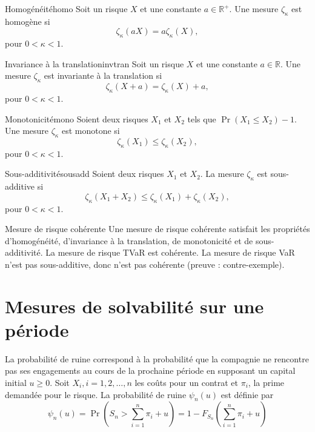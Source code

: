 \begin{propriete}{Homogénéité}{homo}
	Soit un risque $X$ et une constante $a \in \mathbb{R}^+$. Une mesure $\zeta_\kappa$ est homogène si $$\zeta_\kappa(aX) = a\zeta_\kappa(X),$$
	pour $0<\kappa<1$.
\end{propriete}

\begin{propriete}{Invariance à la translation}{invtran}
	Soit un risque $X$ et une constante $a \in \mathbb{R}$. Une mesure $\zeta_\kappa$ est invariante à la translation si $$\zeta_\kappa(X + a) = \zeta_\kappa(X) + a,$$
	pour $0<\kappa<1$.
\end{propriete}

\begin{propriete}{Monotonicité}{mono}
	Soient deux risques $X_1$ et $X_2$ tels que $\Pr(X_1 \leq X_2) - 1$. Une mesure $\zeta_\kappa$ est monotone si 
	$$\zeta_\kappa(X_1) \leq \zeta_\kappa(X_2),$$
	pour $0<\kappa<1$.
\end{propriete}

\begin{propriete}{Sous-additivité}{sousadd}
	Soient deux risques $X_1$ et $X_2$. La mesure $\zeta_\kappa$ est sous-additive si 
	$$\zeta_\kappa(X_1 + X_2)\leq \zeta_\kappa(X_1) + \zeta_\kappa(X_2),$$
	pour $0<\kappa<1$.
\end{propriete}

\begin{definition}{Mesure de risque cohérente}{}
	Une mesure de risque cohérente satisfait les propriétés d'homogénéité, d'invariance à la translation, de monotonicité et de sous-additivité. La mesure de risque TVaR est cohérente. La mesure de risque VaR n'est pas sous-additive, donc n'est pas cohérente (preuve : contre-exemple).
\end{definition}

\section{Mesures de solvabilité sur une période}

\begin{definition}{}{}
	La probabilité de ruine correspond à la probabilité que la compagnie ne rencontre pas ses engagements au cours de la prochaine période en supposant un capital initial $u\geq 0$. Soit $X_i, i = 1, 2, \dots, n$ les coûts pour un contrat et $\pi_i$, la prime demandée pour le risque. La probabilité de ruine $\psi_n(u)$ est définie par
	$$\psi_n(u) = \Pr\left(S_n > \sum_{i = 1}^{n} \pi_i + u\right) = 1 - F_{S_n}\left(\sum_{i = 1}^{n}\pi_i + u\right)$$
\end{definition}
